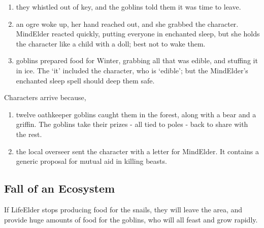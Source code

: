 \begin{enumerate}
  \item
  they whistled out of key, and the goblins told them it was time to leave.
  \item
  an ogre woke up, her hand reached out, and she grabbed the character.
  \gls{MindElder} reacted quickly, putting everyone in enchanted sleep, but she holds the character like a child with a doll; best not to wake them.
  \item
  goblins prepared food for Winter, grabbing all that was edible, and stuffing it in ice.
  The `it' included the character, who is `edible'; but the \gls{MindElder}'s enchanted sleep spell should deep them safe.
\end{enumerate}

Characters arrive because,

\begin{enumerate}
  \item
  twelve oathkeeper goblins caught them in the forest, along with a bear and a griffin.
  The goblins take their prizes - all tied to poles - back to share with the rest.
  \item
  the local overseer sent the character with a letter for \gls{MindElder}.
  It contains a generic proposal for mutual aid in killing beasts.
\end{enumerate}

\subsection{Fall of an Ecosystem}

If \gls{LifeElder} stops producing food for the snails, they will leave the area, and provide huge amounts of food for the goblins, who will all feast and grow rapidly.


